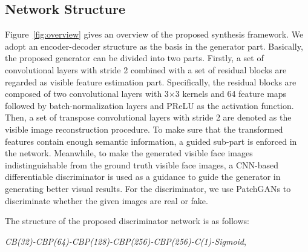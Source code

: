 \documentclass[10pt,twocolumn,letterpaper]{article}
\begin{document}
\subsection{Network Structure}
Figure~\ref{fig:overview} gives an overview of the proposed synthesis framework.  We adopt an encoder-decoder structure as the basis in the generator part.  Basically, the proposed generator can be divided into two parts. Firstly, a set of convolutional layers with stride 2 combined with a set of residual blocks \cite{perceptual_loss} are regarded as visible feature estimation part. Specifically, the residual blocks are composed of two convolutional layers with 3$\times3$ kernels and 64 feature maps followed by batch-normalization layers \cite{batch_norm} and PReLU \cite{prelu} as the activation function. Then, a set of transpose convolutional layers with stride 2 are denoted as the visible image reconstruction procedure.   To make sure that the transformed features contain enough semantic information, a guided sub-part is enforced in the network. Meanwhile, to make the generated visible face images indistinguishable from the ground truth visible face images, a CNN-based differentiable discriminator is used as a guidance to guide the generator in generating better visual results. For the discriminator, we use PatchGANs \cite{GAN_pix2pix2016} to discriminate whether the given images are real or fake.

The structure of the proposed discriminator network is as follows: 

\noindent \emph{CB(32)-CBP(64)-CBP(128)-CBP(256)-CBP(256)-C(1)-Sigmoid},\\
\end{document}
